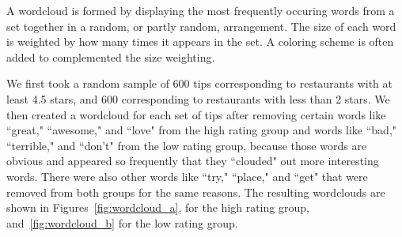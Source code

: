 \documentclass[11pt]{article}
\begin{document}
A wordcloud is formed by displaying the most frequently occuring words from a set together in a random, or partly random, arrangement. The size of each word is weighted by how many times it appears in the set. A coloring scheme is often added to complemented the size weighting.

We first took a random sample of 600 tips corresponding to restaurants with at least 4.5 stars, and 600 corresponding to restaurants with less than 2 stars. We then created a wordcloud for each set of tips after removing certain words like ``great," ``awesome," and ``love" from the high rating group and words like ``bad," ``terrible," and ``don't" from the low rating group, because those words are obvious and appeared so frequently that they ``clouded" out more interesting words. There were also other words like ``try," ``place," and ``get" that were removed from both groups for the same reasons. The resulting wordclouds are shown in Figures~\ref{fig:wordcloud_a}, for the high rating group, and~\ref{fig:wordcloud_b} for the low rating group.
\end{document}
